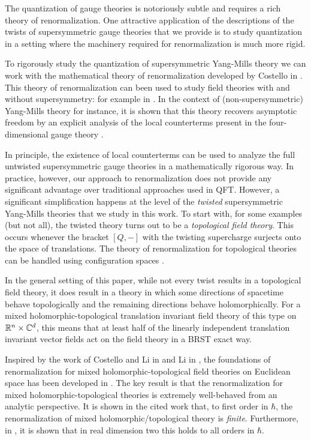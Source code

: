 \documentclass[10pt, oneside]{article}
\begin{document}
The quantization of gauge theories is notoriously subtle and requires a rich theory of renormalization.  One attractive application of the descriptions of the twists of supersymmetric gauge theories that we provide is to study quantization in a setting where the machinery required for renormalization is much more rigid.

To rigorously study the quantization of supersymmetric Yang-Mills theory we can work with the mathematical theory of renormalization developed by Costello in \cite{CostelloBook}. This theory of renormalization can been used to study field theories with and without supersymmetry: for example in \cite{CostelloWittengenus, LiLi, BCOV1, ChanLeungLi, GradyLiLi}. In the context of (non-supersymmetric) Yang-Mills theory for instance, it is shown that this theory recovers asymptotic freedom by an explicit analysis of the local counterterms present in the four-dimensional gauge theory \cite{EWY}.  

In principle, the existence of local counterterms can be used to analyze the full untwisted supersymmetric gauge theories in a mathematically rigorous way.  In practice, however, our approach to renormalization does not provide any significant advantage over traditional approaches used in QFT.  However, a significant simplification happens at the level of the {\em twisted} supersymmetric Yang-Mills theories that we study in this work. To start with, for some examples (but not all), the twisted theory turns out to be a {\em topological field theory}.  This occurs whenever the bracket $[Q,-]$ with the twisting supercharge surjects onto the space of translations. The theory of renormalization for topological theories can be handled using configuration spaces \cite{Kontsevich, AxelrodSinger}. 

In the general setting of this paper, while not every twist results in a topological field theory, it does result in a theory in which some directions of spacetime behave topologically and the remaining directions behave holomorphically. For a mixed holomorphic-topological translation invariant field theory of this type on $\mathbb R^n \times \mathbb C^d$, this means that at least half of the linearly independent translation invariant vector fields act on the field theory in a BRST exact way.

Inspired by the work of Costello and Li in \cite{BCOV1} and Li in \cite{LiFeynman, LiVertex}, the foundations of renormalization for mixed holomorphic-topological field theories on Euclidean space has been developed in \cite{BWhol}. The key result is that the renormalization for mixed holomorphic-topological theories is extremely well-behaved from an analytic perspective. It is shown in the cited work that, to first order in $\hbar$, the renormalization of mixed holomorphic/topological theory is {\em finite}. Furthermore, in \cite{LiVertex}, it is shown that in real dimension two this holds to all orders in $\hbar$. 
\end{document}
